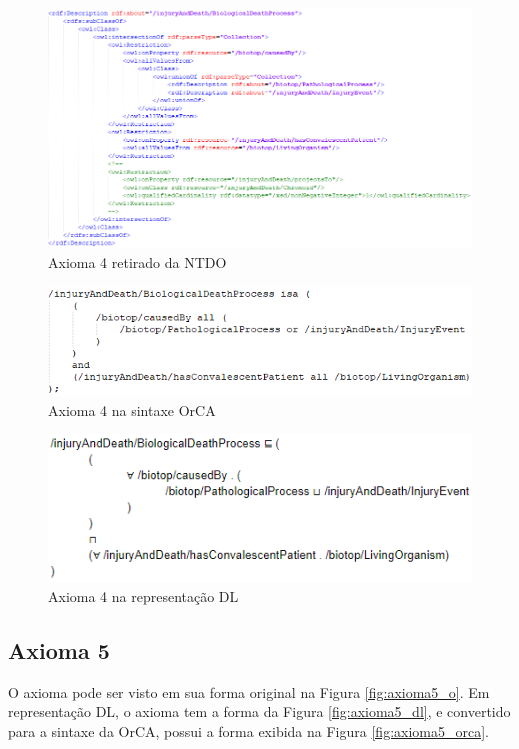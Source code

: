 \documentclass{bcc}
\begin{document}
\begin{figure}[H]
\centering
\includegraphics[width=1\textwidth]{Figuras/axioma4_o.png}
\caption{Axioma 4 retirado da NTDO} 
\label{fig:axioma4_o}
\end{figure}

\begin{figure}[H]
\centering
\includegraphics[width=.7\textwidth]{Figuras/axioma4_orca.png}
\caption{Axioma 4 na sintaxe OrCA} 
\label{fig:axioma4_orca}
\end{figure}

\begin{figure}[H]
\centering
\includegraphics[width=.7\textwidth]{Figuras/axioma4_dl.png}
\caption{Axioma 4 na representação DL} 
\label{fig:axioma4_dl}
\end{figure}

\subsection{Axioma 5}
O axioma pode ser visto em sua forma original na Figura \ref{fig:axioma5_o}. Em representação DL, o axioma tem a forma da Figura \ref{fig:axioma5_dl}, e convertido para a sintaxe da OrCA, possui a forma exibida na Figura \ref{fig:axioma5_orca}. 
\end{document}
